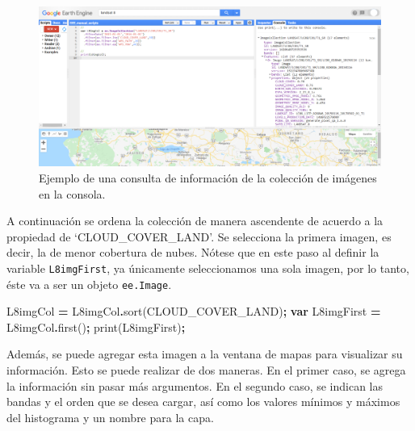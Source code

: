 \documentclass[
  12pt,
  letterpaper,
  twoside]{book}
\newenvironment{Shaded}{\begin{snugshade}}{\end{snugshade}}
\newcommand{\FunctionTok}[1]{\textcolor[rgb]{0.00,0.00,0.00}{#1}}
\newcommand{\KeywordTok}[1]{\textcolor[rgb]{0.13,0.29,0.53}{\textbf{#1}}}
\newcommand{\NormalTok}[1]{#1}
\newcommand{\OperatorTok}[1]{\textcolor[rgb]{0.81,0.36,0.00}{\textbf{#1}}}
\newcommand{\StringTok}[1]{\textcolor[rgb]{0.31,0.60,0.02}{#1}}
\begin{document}
\begin{figure}

{\centering \includegraphics[width=1\linewidth]{Img/CamposImgCol} 

}

\caption{Ejemplo de una consulta de información de la colección de imágenes en la consola.}\label{fig:unnamed-chunk-144}
\end{figure}

A continuación se ordena la colección de manera ascendente de acuerdo a la propiedad de `CLOUD\_COVER\_LAND'. Se selecciona la primera imagen, es decir, la de menor cobertura de nubes. Nótese que en este paso al definir la variable \texttt{L8imgFirst}, ya únicamente seleccionamos una sola imagen, por lo tanto, éste va a ser un objeto \texttt{ee.Image}.

\begin{Shaded}
\begin{Highlighting}[]
\NormalTok{L8imgCol }\OperatorTok{=}\NormalTok{ L8imgCol}\OperatorTok{.}\FunctionTok{sort}\NormalTok{(}\StringTok{\textquotesingle{}CLOUD\_COVER\_LAND\textquotesingle{}}\NormalTok{)}\OperatorTok{;}
\KeywordTok{var}\NormalTok{ L8imgFirst }\OperatorTok{=}\NormalTok{ L8imgCol}\OperatorTok{.}\FunctionTok{first}\NormalTok{()}\OperatorTok{;} 
\FunctionTok{print}\NormalTok{(L8imgFirst)}\OperatorTok{;}
\end{Highlighting}
\end{Shaded}

Además, se puede agregar esta imagen a la ventana de mapas para visualizar su información. Esto se puede realizar de dos maneras. En el primer caso, se agrega la información sin pasar más argumentos. En el segundo caso, se indican las bandas y el orden que se desea cargar, así como los valores mínimos y máximos del histograma y un nombre para la capa.
\end{document}
